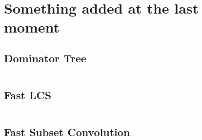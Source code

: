 \section{Something added at the last moment}

\subsection{Dominator Tree}

\inputminted{cpp}{code/dominator_tree.cpp}

\subsection{Fast LCS}

\inputminted{cpp}{code/fast_lcs.cpp}

\subsection{Fast Subset Convolution}

\inputminted{cpp}{code/fast_subset_convolution.cpp}
